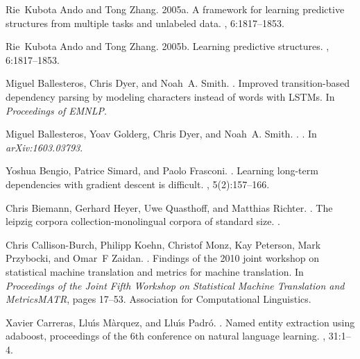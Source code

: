 \documentclass[11pt,letterpaper]{article}
\begin{document}

\begin{thebibliography}{}

Rie~Kubota Ando and Tong Zhang.
\newblock 2005a.
\newblock A framework for learning predictive structures from multiple tasks
  and unlabeled data.
, 6:1817--1853.

Rie~Kubota Ando and Tong Zhang.
\newblock 2005b.
\newblock Learning predictive structures.
, 6:1817--1853.

Miguel Ballesteros, Chris Dyer, and Noah~A. Smith.
.
\newblock Improved transition-based dependency parsing by modeling characters
  instead of words with {LSTMs}.
\newblock In {\em {Proceedings of EMNLP}}.

Miguel Ballesteros, Yoav Golderg, Chris Dyer, and Noah~A. Smith.
.
.
\newblock In {\em arXiv:1603.03793}.

Yoshua Bengio, Patrice Simard, and Paolo Frasconi.
.
\newblock Learning long-term dependencies with gradient descent is difficult.
, 5(2):157--166.

Chris Biemann, Gerhard Heyer, Uwe Quasthoff, and Matthias Richter.
.
\newblock The leipzig corpora collection-monolingual corpora of standard size.
.

Chris Callison-Burch, Philipp Koehn, Christof Monz, Kay Peterson, Mark
  Przybocki, and Omar~F Zaidan.
.
\newblock Findings of the 2010 joint workshop on statistical machine
  translation and metrics for machine translation.
\newblock In {\em Proceedings of the Joint Fifth Workshop on Statistical
  Machine Translation and MetricsMATR}, pages 17--53. Association for
  Computational Linguistics.

Xavier Carreras, Llu{\'\i}s M{\`a}rquez, and Llu{\'\i}s Padr{\'o}.
.
\newblock Named entity extraction using adaboost, proceedings of the 6th
  conference on natural language learning.
, 31:1--4.


\end{thebibliography}
\end{document}
